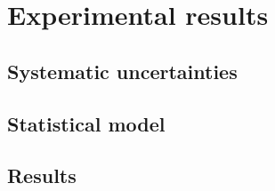 
\chapter{Experimental results}
\label{chap:results}

\section{Systematic uncertainties}
	\label{sec:systematics}
	
\section{Statistical model}
	\label{sec:stats}
	
\section{Results}
	\label{sec:results}
	

\clearpage


